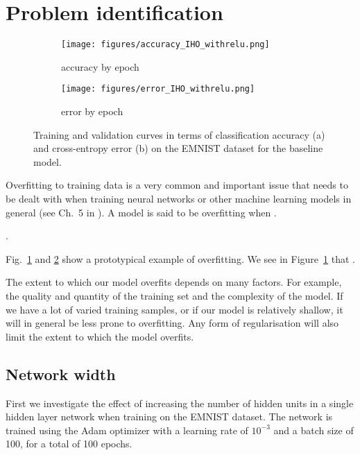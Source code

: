 \documentclass{article}
\begin{document}
\section{Problem identification}
\label{sec:task1}

\begin{figure}[t]
    \centering
    \begin{subfigure}{\linewidth}
        \texttt{[image: figures/accuracy\_IHO\_withrelu.png]}
        \caption{accuracy by epoch}
        \label{fig:example_acccurves}
    \end{subfigure}
    \begin{subfigure}{\linewidth}
        \centering
        \texttt{[image: figures/error\_IHO\_withrelu.png]}
        \caption{error by epoch}
        \label{fig:example_errorcurves}
    \end{subfigure}
    \caption{Training and validation curves in terms of classification accuracy (a) and cross-entropy error (b) on the EMNIST dataset for the baseline model.}
    \label{fig:example}
\end{figure}

Overfitting to training data is a very common and important issue that needs to be dealt with when training neural networks or other machine learning models in general (see Ch.~5 in \citealt{Goodfellow-et-al-2016}).
A model is said to be overfitting when \questionFive.

\questionSix.

Fig.~\ref{fig:example_acccurves} and \ref{fig:example_errorcurves} show a prototypical example of overfitting.
We see in Figure~\ref{fig:example_acccurves} that \questionSeven.

The extent to which our model overfits depends on many factors.
For example, the quality and quantity of the training set and
the complexity of the model. If we have a lot of varied training samples,
or if our model is relatively shallow, it will in general
be less prone to overfitting. Any form of regularisation
will also limit the extent to which the model overfits.


\subsection{Network width}

\questionTableOne
\questionFigureTwo


First we investigate the effect of increasing the number of
hidden units in a single hidden layer network when training
on the EMNIST dataset.
The network is trained using the Adam optimizer
with a learning rate of $10^{-3}$ and a batch size of 100, for a total of 100 epochs.
\end{document}
